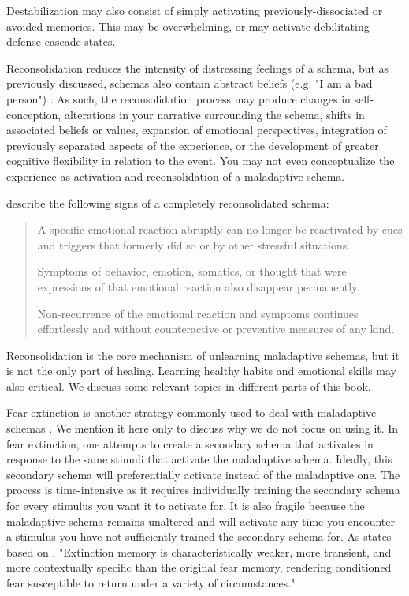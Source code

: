 \documentclass[12pt,letterpaper]{book}
\begin{document}
Destabilization may also consist of simply activating previously-dissociated or avoided memories. This may be overwhelming, or may activate debilitating defense cascade states.

Reconsolidation reduces the intensity of distressing feelings of a schema, but as previously discussed, schemas also contain abstract beliefs (e.g. "I am a bad person") \cite{laneReconsolidation}. As such, the reconsolidation process may produce changes in self-conception, alterations in your narrative surrounding the schema, shifts in associated beliefs or values, expansion of emotional perspectives, integration of previously separated aspects of the experience, or the development of greater cognitive flexibility in relation to the event. You may not even conceptualize the experience as activation and reconsolidation of a maladaptive schema.

\textcite{eckerUnlocking} describe the following signs of a completely reconsolidated schema:
\begin{quotation}
    A specific emotional reaction abruptly can no longer be reactivated by cues and triggers that formerly did so or by other stressful situations.
    
    Symptoms of behavior, emotion, somatics, or thought that were expressions of that emotional reaction also disappear permanently.
    
    Non-recurrence of the emotional reaction and symptoms continues effortlessly and without counteractive or preventive measures of any kind.
\end{quotation}

Reconsolidation is the core mechanism of unlearning maladaptive schemas, but it is not the only part of healing. Learning healthy habits and emotional skills may also critical. We discuss some relevant topics in different parts of this book.

Fear extinction is another strategy commonly used to deal with maladaptive schemas \cite{eckerUnlocking}. We mention it here only to discuss why we do not focus on using it. In fear extinction, one attempts to create a secondary schema that activates in response to the same stimuli that activate the maladaptive schema. Ideally, this secondary schema will preferentially activate instead of the maladaptive one. The process is time-intensive as it requires individually training the secondary schema for every stimulus you want it to activate for. It is also fragile because the maladaptive schema remains unaltered and will activate any time you encounter a stimulus you have not sufficiently trained the secondary schema for. As \textcite{doss2024memory} states based on \textcite{dunsmoor2022laboratory}, "Extinction memory is characteristically weaker, more transient, and more contextually specific than the original fear memory, rendering conditioned fear susceptible to return under a variety of circumstances."
\end{document}
